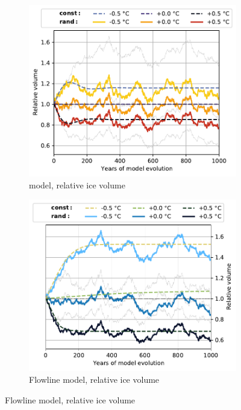 \begin{figure}[p]
  \centering

  \begin{subfigure}[b]{0.476\textwidth}
    \caption{\Vas{} model, relative ice volume}
    \label{fig:Pasterze:volume_vas}
    \centering
    \includegraphics[width=\textwidth]{../plots/final_plots/time_series/single_glaciers/volume_norm_vas_Pasterze.pdf}
  \end{subfigure}
  \hfill
  \begin{subfigure}[b]{0.476\textwidth}
    \caption{Flowline model, relative ice volume}
    \label{fig:Pasterze:volume_fl}
    \centering
    \includegraphics[width=\textwidth]{../plots/final_plots/time_series/single_glaciers/volume_norm_fl_Pasterze.pdf}
  \end{subfigure}


\end{figure}
